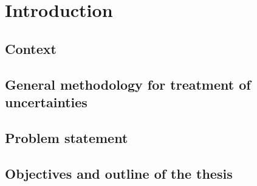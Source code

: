 \chapter*{Introduction}


\section*{Context}




\section*{General methodology for treatment of uncertainties}




\section*{Problem statement}




\section*{Objectives and outline of the thesis}




